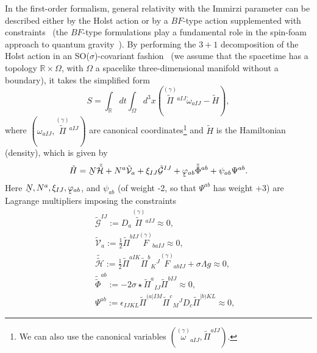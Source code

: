 \documentclass[aps,prd,reprint,showpacs,longbibliography,superscriptaddress, groupedaddres,
titlepage,nofootinbib]{revtex4-1} %
\begin{document}
In the first-order formalism, general relativity with the Immirzi parameter can be described either by the Holst action or by a $BF$-type action supplemented with constraints~\cite{CMPR2001,*cqgrevBF} (the $BF$-type formulations play a fundamental role in the spin-foam approach to quantum gravity~\cite{alexandrov2012spin,*perez2013}). By performing the $3+1$ decomposition of the Holst action in an SO($\sigma$)-covariant fashion~\cite{Barros} (we assume that the spacetime has a topology $\mathbb{R}\times \Omega$, with $\Omega$ a spacelike three-dimensional manifold without a boundary), it takes the simplified form
\begin{equation}\label{Act3+1}
	S=\int_\mathbb{R} dt\int_\Omega d^3x\left(\stackrel{(\gamma)}{\tilde{\Pi}} {}^{aIJ}\dot{\omega}_{aIJ}-\tilde{H}\right),
\end{equation}
where $(\omega_{aIJ},\stackrel{(\gamma)}{\tilde{\Pi}}{}^{aIJ})$ are canonical coordinates\footnote{We can also use the canonical variables $(\stackrel{(\gamma)}{\omega}{}_{aIJ},\tilde{\Pi}^{aIJ})$.} and $\tilde{H}$ is the Hamiltonian (density), which is given by
\begin{equation}\label{Hamact}
\tilde{H}=\underaccent{\tilde}{N}\tilde{\tilde{\mathcal{H}}} + N^a\tilde{\mathcal{V}}_a + \xi_{IJ}\tilde{\mathcal{G}}^{IJ}+\underaccent{\tilde}{\varphi}{}_{ab}\tilde{\tilde{\Phi}}{}^{ab}+\psi_{ab}\Psi^{ab}.
\end{equation}
Here $\underaccent{\tilde}{N},N^a,\xi_{IJ},\underaccent{\tilde}{\varphi}{}_{ab}$, and $\psi_{ab}$ (of weight -2, so that $\Psi^{ab}$ has weight +3) are Lagrange multipliers imposing the constraints
\begin{subequations}
\begin{eqnarray}
&&\tilde{\mathcal{G}}^{IJ}:= D_a \stackrel{(\gamma)}{\tilde{\Pi}}\!\!{}^{aIJ} \approx 0, \label{Gauss}\\
&&\tilde{\mathcal{V}}_a := \frac{1}{2}\tilde{\Pi}^{bIJ}\stackrel{(\gamma)}{F}\!\!{}{_{baIJ}} \approx 0,\label{Vector} \\
&&\tilde{\tilde{\mathcal{H}}}:=\frac{1}{2} \tilde{\Pi}^{aIK}\tilde{\Pi}^b{}_K{}^J\stackrel{(\gamma)}{F}\!\!{}{_{abIJ}} + \sigma\Lambda g \approx 0 ,\label{Scalar}\\
&&\tilde{\tilde{\Phi}}^{ab} := -2\sigma\star\tilde{\Pi}^a{}_{IJ}\tilde{\Pi}^{bIJ} \approx 0, \label{phi}\\
&&\Psi^{ab} := \epsilon_{IJKL}\tilde{\Pi}^{(a|IM}\tilde{\Pi}^c{}_M{}^JD_c \tilde{\Pi}^{|b)KL}\approx 0\label{psi},   	
\end{eqnarray}
\end{subequations}
\end{document}
